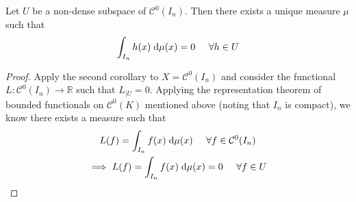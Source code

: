 \documentclass{article}
\numberwithin{equation}{subsection}
\begin{document}
\begin{lemma}
    Let $U$ be a non-dense subspace of $\mathcal{C}^0(I_n)$. Then there exists a unique measure $\mu$ such that
    \begin{equation*}
        \int_{I_n} h(x) \;\text{d} \mu(x) = 0 \;\;\;\;\; \forall h \in U
    \end{equation*}
\end{lemma}
\begin{proof}
    Apply the second corollary to $X = \mathcal{C}^0(I_n)$ and consider the functional $L : \mathcal{C}^0(I_n) \to \mathbb{R}$ such that $L_{\vert U} = 0$. Applying the representation theorem of bounded functionals on $\mathcal{C}^0(K)$ mentioned above (noting that $I_n$ is compact), we know there exists a measure such that
    \begin{gather*}
        L(f) = \int_{I_n} f(x) \;\text{d} \mu(x) \;\;\;\;\; \forall f \in \mathcal{C}^0(I_n) \\
        \implies L(f) = \int_{I_n} f(x) \;\text{d} \mu(x) = 0 \;\;\;\;\; \forall f \in U
    \end{gather*}
\end{proof}
\end{document}
